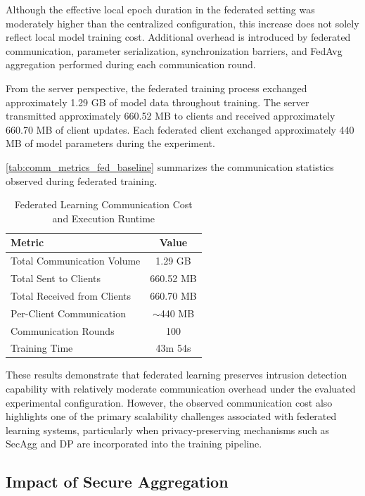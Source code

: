 \documentclass[conference]{IEEEtran}
\begin{document}
Although the effective local epoch duration in the federated setting was moderately higher than the centralized configuration, this increase does not solely reflect local model training cost. Additional overhead is introduced by federated communication, parameter serialization, synchronization barriers, and FedAvg aggregation performed during each communication round.

From the server perspective, the federated training process exchanged approximately 1.29 GB of model data throughout training. The server transmitted approximately 660.52 MB to clients and received approximately 660.70 MB of client updates. Each federated client exchanged approximately 440 MB of model parameters during the experiment.

\autoref{tab:comm_metrics_fed_baseline} summarizes the communication statistics observed during federated training.

\begin{table}[ht]
    \centering
    \renewcommand{\arraystretch}{1.3}
    \begin{tabular}{|l|c|}
        \hline
        \textbf{Metric} & \textbf{Value} \\ \hline
        Total Communication Volume & 1.29 GB \\ \hline
        Total Sent to Clients & 660.52 MB \\ \hline
        Total Received from Clients & 660.70 MB \\ \hline
        Per-Client Communication & $\sim$440 MB \\ \hline
        Communication Rounds & 100 \\ \hline
        Training Time & 43m 54s \\ \hline
    \end{tabular}
    \caption{Federated Learning Communication Cost and Execution Runtime}
    \label{tab:comm_metrics_fed_baseline}
\end{table}

These results demonstrate that federated learning preserves intrusion detection capability with relatively moderate communication overhead under the evaluated experimental configuration. However, the observed communication cost also highlights one of the primary scalability challenges associated with federated learning systems, particularly when privacy-preserving mechanisms such as SecAgg and DP are incorporated into the training pipeline.

\subsection{Impact of Secure Aggregation}
\end{document}
